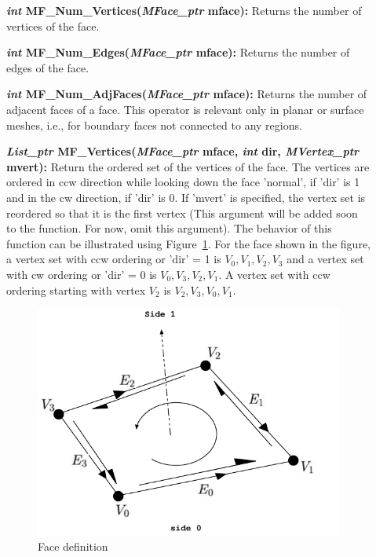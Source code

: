 \documentclass[12pt]{article}
\begin{document}
\begin{description}
\item[]\textbf{\textit{int} MF\_Num\_Vertices(\textit{MFace\_ptr} mface):} Returns the number of vertices of the face.

\item[]\textbf{\textit{int} MF\_Num\_Edges(\textit{MFace\_ptr} mface):} Returns the number of edges of the face.
  
\item[]\textbf{\textit{int} MF\_Num\_AdjFaces(\textit{MFace\_ptr}
    mface):} Returns the number of adjacent faces of a face. This
  operator is relevant only in planar or surface meshes, i.e., for
  boundary faces not connected to any regions.
  
\item[]\textbf{\textit{List\_ptr} MF\_Vertices(\textit{MFace\_ptr}
    mface, \textit{int} dir, \textit{MVertex\_ptr} mvert):} Return the
  ordered set of the vertices of the face. The vertices are ordered in
  ccw direction while looking down the face 'normal', if 'dir' is 1
  and in the cw direction, if 'dir' is 0. If 'mvert' is specified, the
  vertex set is reordered so that it is the first vertex (This
  argument will be added soon to the function. For now, omit this
  argument). The behavior of this function can be illustrated using
  Figure~\ref{fig:face_def}. For the face shown in the figure, a
  vertex set with ccw ordering or 'dir' = 1 is ${V_0,V_1,V_2,V_3}$ and
  a vertex set with cw ordering or 'dir' = 0 is ${V_0,V_3,V_2,V_1}$.
  A vertex set with ccw ordering starting with vertex $V_2$ is
  ${V_2,V_3,V_0,V_1}$.

\begin{figure}[!h]
  \begin{center}
  \includegraphics[scale=1.0]{figures/face_def} 
  \caption{Face definition}
  \label{fig:face_def}
  \end{center}
\end{figure}



\end{description}
\end{document}
